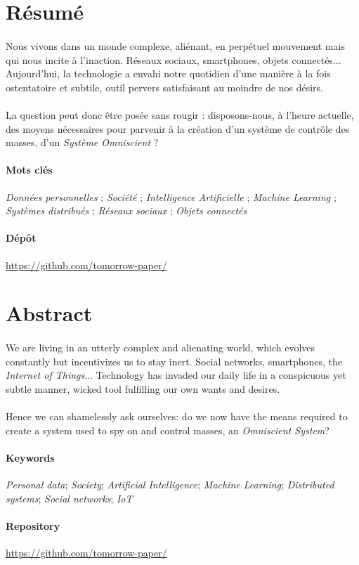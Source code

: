 \section*{Résumé}

\paragraph{} Nous vivons dans un monde complexe, aliénant, en perpétuel mouvement mais qui
nous incite à l'inaction. Réseaux sociaux, smartphones, objets connectés... Aujourd'hui, la
technologie a envahi notre quotidien d'une manière à la fois ostentatoire et subtile, outil
pervers satisfaisant au moindre de nos désirs.

\paragraph{} La question peut donc être posée sans rougir : disposons-nous, à l'heure
actuelle, des moyens nécessaires pour parvenir à la création d'un système de contrôle des
masses, d'un \emph{Système Omniscient} ?

\paragraph{Mots clés}
\emph{Données personnelles} ;
\emph{Société} ;
\emph{Intelligence Artificielle} ;
\emph{Machine Learning} ;
\emph{Systèmes distribués} ;
\emph{Réseaux sociaux} ;
\emph{Objets connectés}

\paragraph{Dépôt} \url{https://github.com/tomorrow-paper/}


\section*{Abstract}

\paragraph{} We are living in an utterly complex and alienating world, which evolves constantly
but incentivizes us to stay inert. Social networks, smartphones, the \emph{Internet of Things}...
Technology has invaded our daily life in a conspicuous yet subtle manner, wicked tool fulfilling
our own wants and desires.

\paragraph{} Hence we can shamelessly ask ourselves: do we now have the means required to create
a system used to spy on and control masses, an \emph{Omniscient System}?

\paragraph{Keywords}
\emph{Personal data};
\emph{Society};
\emph{Artificial Intelligence};
\emph{Machine Learning};
\emph{Distributed systems};
\emph{Social networks};
\emph{IoT}

\paragraph{Repository} \url{https://github.com/tomorrow-paper/}